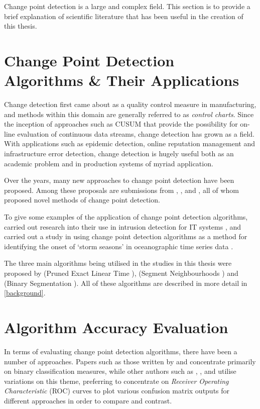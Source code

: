 \documentclass[../main.tex]{subfiles}
\begin{document}
Change point detection is a large and complex field. This section is to provide a brief explanation of scientific literature that has been useful in the creation of this thesis.

\section{Change Point Detection Algorithms \& Their Applications}

Change detection first came about as a quality control measure in manufacturing, and methods within this domain are generally referred to as \emph{control charts}. Since the inception of approaches such as CUSUM \cite{Page1954} that provide the possibility for on-line evaluation of continuous data streams, change detection has grown as a field. With applications such as epidemic detection, online reputation management and infrastructure error detection, change detection is hugely useful both as an academic problem and in production systems of myriad application.

Over the years, many new approaches to change point detection have been proposed. Among these proposals are submissions from \citeauthor{Desobry2005} \cite{Desobry2005}, \citeauthor{Kawahara2009} \cite{Kawahara2009}, and \citeauthor{Downey2008} \cite{Downey2008}, all of whom proposed novel methods of change point detection.

To give some examples of the application of change point detection algorithms, \citeauthor{Tartakovsky2005} carried out research into their use in intrusion detection for IT systems \cite{Tartakovsky2005}, and \citeauthor{Killick2011} carried out a study in using change point detection algorithms as a method for identifying the onset of `storm seasons' in oceanographic time series data \cite{Killick2011}.

The three main algorithms being utilised in the studies in this thesis were proposed by \citeauthor{Killick2011a} (Pruned Exact Linear Time \cite{Killick2011a}), \citeauthor{Auger1989} (Segment Neighbourhoods \cite{Auger1989}) and \citeauthor{Jackson2003} (Binary Segmentation \cite{Jackson2003}). All of these algorithms are described in more detail in \autoref{background}.

\section{Algorithm Accuracy Evaluation}

In terms of evaluating change point detection algorithms, there have been a number of approaches. Papers such as those written by \citeauthor{Buntain2014} \cite{Buntain2014} and \citeauthor{Qahtan2015} \cite{Qahtan2015} concentrate primarily on binary classification measures, while other authors such as \citeauthor{Desobry2005} \cite{Desobry2005}, \citeauthor{Fawcett1999} \cite{Fawcett1999}, and \citeauthor{Kawahara2009} \cite{Kawahara2009} utilise variations on this theme, preferring to concentrate on \emph{Receiver Operating Characteristic} (ROC) curves to plot various confusion matrix outputs for different approaches in order to compare and contrast.
\end{document}
